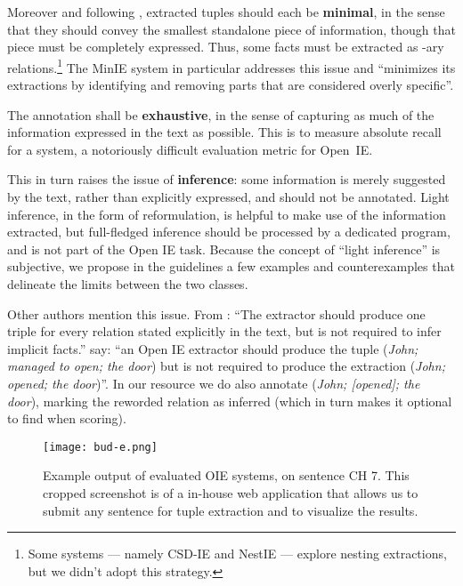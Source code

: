 \pdfoutput=1 \documentclass[11pt, a4paper]{article}
\begin{document}
Moreover and following \cite{Stanovsky2016EMNLP}, extracted tuples should
each be \textbf{minimal}, in the sense that they should convey the smallest
standalone piece of information, though that piece must be completely
expressed. Thus, some facts must be extracted as
-ary relations.\footnote{Some systems --- namely CSD-IE
\cite{bast2013open} and NestIE \cite{D16-1006} --- explore nesting
extractions, but we didn't adopt this strategy.} The MinIE system in particular addresses this issue and ``minimizes its
extractions by identifying and removing parts that are considered overly
specific''.

The annotation shall be \textbf{exhaustive}, in the sense of capturing as much of
the information expressed in the text as possible. This is to measure
absolute recall for a system, a notoriously difficult evaluation metric for
Open~IE.

This in turn raises the issue of \textbf{inference}: some information is merely
suggested by the text, rather than explicitly expressed, and should not be
annotated. Light inference, in the form of reformulation, is helpful to
make use of the information extracted, but full-fledged inference should be
processed by a dedicated program, and is not part of the Open IE task. Because the concept of ``light inference'' is subjective, we propose in the guidelines a few examples and counterexamples that delineate the limits between the two classes. 

Other authors mention this issue. From \cite{Wu:2010:OIE:1858681.1858694} :
``The extractor should produce one triple for every relation stated
explicitly in the text, but is not required to infer implicit facts.''
\citet{Stanovsky2016EMNLP} say: ``an Open IE extractor should produce the tuple
(\emph{John; managed to open; the door}) but is not required to produce the
extraction (\emph{John; opened; the door})''. In our resource we do also
annotate (\emph{John; [opened]; the door}), marking the reworded relation as
inferred (which in turn makes it optional to find when scoring).

\begin{figure}[htb]
\centering
  {\texttt{[image: bud-e.png]}}
  \caption{Example output of evaluated OIE systems, on sentence CH 7. This cropped 
    screenshot is of a in-house web application that allows us to submit any
    sentence for tuple extraction and to visualize the results.}
  \label{fig-buddleia}
\end{figure}
\end{document}
